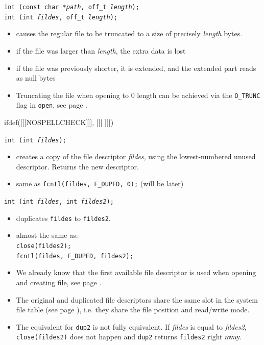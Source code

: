 \begin{slide}
\texttt{int (const char *\emph{path}, off\_t \emph{length});\\
int (int \emph{fildes}, off\_t \emph{length});}
\begin{itemize}
\item causes the regular file to be truncated to a size of precisely
\emph{length} bytes.
\item if the file was larger than \emph{length}, the extra data is lost
\item if the file was previously shorter, it is extended, and the extended part
reads as null bytes
\end{itemize}
\end{slide}

\begin{itemize}
\item Truncating the file when opening to 0 length can be achieved via the
\texttt{O\_TRUNC} flag in \texttt{open}, see page \pageref{OPEN}.
\end{itemize}


ifdef([[[NOSPELLCHECK]]], [[[
]]])

\begin{slide}
\texttt{int (int \emph{fildes});}
\begin{itemize}
\item creates a copy of the file descriptor \emph{fildes}, using the
lowest-numbered unused descriptor.  Returns the new descriptor.
\item same as \texttt{fcntl(fildes, F\_DUPFD, 0);} (will be later)
\end{itemize}
\texttt{int (int \emph{fildes}, int \emph{fildes2});}
\begin{itemize}
\item duplicates \texttt{fildes} to \texttt{fildes2}.
\item almost the same as:\\
\texttt{close(fildes2);\\ fcntl(fildes, F\_DUPFD, fildes2);}
\end{itemize}
\end{slide}


\begin{itemize}
\item We already know that the first available file descriptor is used when
opening and creating file, see page \pageref{OPEN}.
\item The original and duplicated file descriptors share the same slot in the
system file table (see page \pageref{OPENFILETABLES}), i.e. they share the file
position and read/write mode.
\item The equivalent for \texttt{dup2} is not fully equivalent.  If
\emph{fildes} is equal to \emph{fildes2}, \texttt{close(fildes2)} does not
happen and \texttt{dup2} returns \texttt{fildes2} right away.
\end{itemize}

